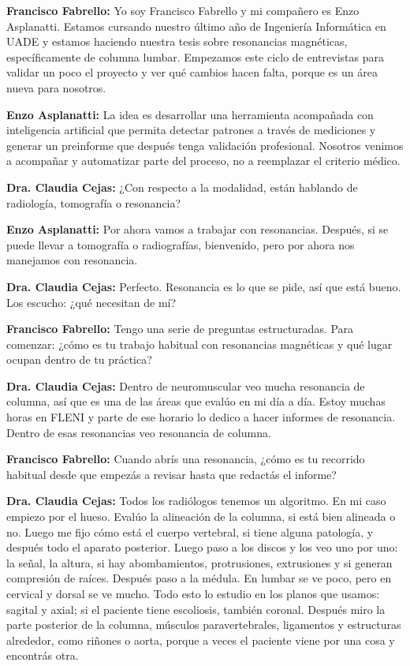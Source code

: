 \noindent\textbf{Francisco Fabrello:} Yo soy Francisco Fabrello y mi compañero es Enzo Asplanatti. Estamos cursando nuestro último año de Ingeniería Informática en UADE y estamos haciendo nuestra tesis sobre resonancias magnéticas, específicamente de columna lumbar. Empezamos este ciclo de entrevistas para validar un poco el proyecto y ver qué cambios hacen falta, porque es un área nueva para nosotros.

\noindent\textbf{Enzo Asplanatti:} La idea es desarrollar una herramienta acompañada con inteligencia artificial que permita detectar patrones a través de mediciones y generar un preinforme que después tenga validación profesional. Nosotros venimos a acompañar y automatizar parte del proceso, no a reemplazar el criterio médico.

\noindent\textbf{Dra. Claudia Cejas:} ¿Con respecto a la modalidad, están hablando de radiología, tomografía o resonancia?

\noindent\textbf{Enzo Asplanatti:} Por ahora vamos a trabajar con resonancias. Después, si se puede llevar a tomografía o radiografías, bienvenido, pero por ahora nos manejamos con resonancia.

\noindent\textbf{Dra. Claudia Cejas:} Perfecto. Resonancia es lo que se pide, así que está bueno. Los escucho: ¿qué necesitan de mí?

\noindent\textbf{Francisco Fabrello:} Tengo una serie de preguntas estructuradas. Para comenzar: ¿cómo es tu trabajo habitual con resonancias magnéticas y qué lugar ocupan dentro de tu práctica?

\noindent\textbf{Dra. Claudia Cejas:} Dentro de neuromuscular veo mucha resonancia de columna, así que es una de las áreas que evalúo en mi día a día. Estoy muchas horas en FLENI y parte de ese horario lo dedico a hacer informes de resonancia. Dentro de esas resonancias veo resonancia de columna.

\noindent\textbf{Francisco Fabrello:} Cuando abrís una resonancia, ¿cómo es tu recorrido habitual desde que empezás a revisar hasta que redactás el informe?

\noindent\textbf{Dra. Claudia Cejas:} Todos los radiólogos tenemos un algoritmo. En mi caso empiezo por el hueso. Evalúo la alineación de la columna, si está bien alineada o no. Luego me fijo cómo está el cuerpo vertebral, si tiene alguna patología, y después todo el aparato posterior. Luego paso a los discos y los veo uno por uno: la señal, la altura, si hay abombamientos, protrusiones, extrusiones y si generan compresión de raíces. Después paso a la médula. En lumbar se ve poco, pero en cervical y dorsal se ve mucho. Todo esto lo estudio en los planos que usamos: sagital y axial; si el paciente tiene escoliosis, también coronal. Después miro la parte posterior de la columna, músculos paravertebrales, ligamentos y estructuras alrededor, como riñones o aorta, porque a veces el paciente viene por una cosa y encontrás otra.

